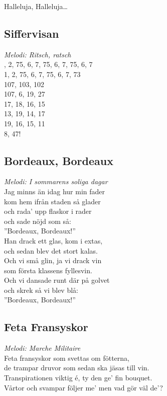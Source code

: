 \documentclass[a5paper]{article}
\begin{document}
		\noindent
		Halleluja, Halleluja…

	\subsection{Siffervisan}
		\textit{Melodi: Ritsch, ratsch} \\
		
		, 2, 75, 6, 7, 75, 6, 7, 75, 6, 7 \\
		1, 2, 75, 6, 7, 75, 6, 7, 73 \\
		107, 103, 102 \\
		107, 6, 19, 27 \\
		17, 18, 16, 15 \\
		13, 19, 14, 17 \\
		19, 16, 15, 11 \\
		8, 47! \\
		
	\subsection{Bordeaux, Bordeaux}
		\textit{Melodi: I sommarens soliga dagar} \\
		
		\noindent
		Jag minns än idag hur min fader \\
		kom hem ifrån staden så glader \\
		och rada’ upp flaskor i rader \\
		och sade nöjd som så: \\
		”Bordeaux, Bordeaux!” \\
		
		\noindent 
		Han drack ett glas, kom i extas, \\
		och sedan blev det stort kalas. \\
		Och vi små glin, ja vi drack vin \\
		som första klassens fyllesvin. \\
		Och vi dansade runt där på golvet \\
		och skrek så vi blev blå:\\
		”Bordeaux, Bordeaux!” \\

		\subsection{Feta Fransyskor}
		\textit{Melodi: Marche Militaire} \\
		
		\noindent
		Feta fransyskor som svettas om fötterna, \\
		de trampar druvor som sedan ska jäsas till vin. \\
		Transpirationen viktig é, ty den ge’ fin bouquet. \\
		Vårtor och svampar följer me’ men vad gör väl de’? \\
		
\end{document}
